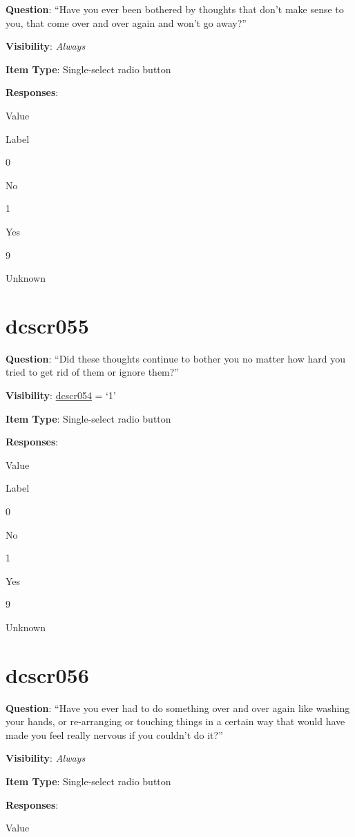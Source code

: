 \documentclass[]{book}
\begin{document}
\textbf{Question}: ``Have you ever been bothered by thoughts that don't make sense to you, that come over and over again and won't go away?''

\textbf{Visibility}: \emph{Always}

\textbf{Item Type}: Single-select radio button

\textbf{Responses}:

Value

Label

0

No

1

Yes

9

Unknown

\hypertarget{dcscr055}{%
\section{dcscr055}\label{dcscr055}}

\textbf{Question}: ``Did these thoughts continue to bother you no matter how hard you tried to get rid of them or ignore them?''

\textbf{Visibility}: \protect\hyperlink{dcscr054}{dcscr054} = `1'

\textbf{Item Type}: Single-select radio button

\textbf{Responses}:

Value

Label

0

No

1

Yes

9

Unknown

\hypertarget{dcscr056}{%
\section{dcscr056}\label{dcscr056}}

\textbf{Question}: ``Have you ever had to do something over and over again like washing your hands, or re-arranging or touching things in a certain way that would have made you feel really nervous if you couldn't do it?''

\textbf{Visibility}: \emph{Always}

\textbf{Item Type}: Single-select radio button

\textbf{Responses}:

Value
\end{document}
